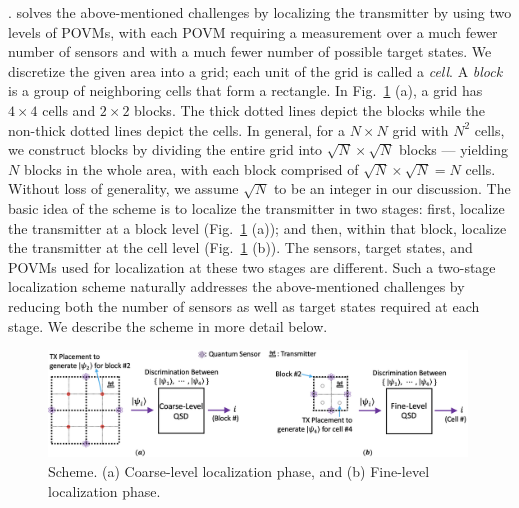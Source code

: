 . 
\povm solves the above-mentioned challenges by localizing the transmitter by using two levels
of POVMs, with each POVM requiring a measurement over a much fewer number of sensors and with a much fewer number of 
possible target states. 
We discretize the given area into a grid; each unit of the grid is called a \emph{cell}. 
A \emph{block} is a group of neighboring cells that form a rectangle. 
In Fig.~\ref{fig:twolevel} (a), a grid has $4\times 4$ cells and $2\times 2$ blocks. 
The thick dotted lines depict the blocks while the non-thick dotted lines depict the cells.
In general, for a $N \times N$ grid with $N^2$ cells, we construct blocks by dividing the entire grid
into $\sqrt{N} \times \sqrt{N}$ blocks --- yielding $N$ blocks in the whole area, with each block comprised of $ \sqrt{N} \times \sqrt{N} = N$ cells. Without loss of generality, we assume $\sqrt{N}$ to be an integer in our discussion.
The basic idea of the \povm scheme
is to localize the transmitter in two stages: first, localize the transmitter at a block level (Fig.~\ref{fig:twolevel} (a)); and then, within that block, localize the transmitter at the cell level (Fig.~\ref{fig:twolevel} (b)). The sensors, target states, and POVMs used for localization at these two stages are different. Such a two-stage localization scheme naturally addresses the above-mentioned challenges by reducing both the number of sensors as well as target states required at 
each stage. We describe the scheme in more detail below.



\begin{figure}[t]
    \centering
    \includegraphics[width=0.99\textwidth]{chapters/qce/figures/twolevel.png}
    \caption{\povm Scheme. (a) Coarse-level localization phase, and (b) Fine-level localization phase.}
    \label{fig:twolevel}
\end{figure}

